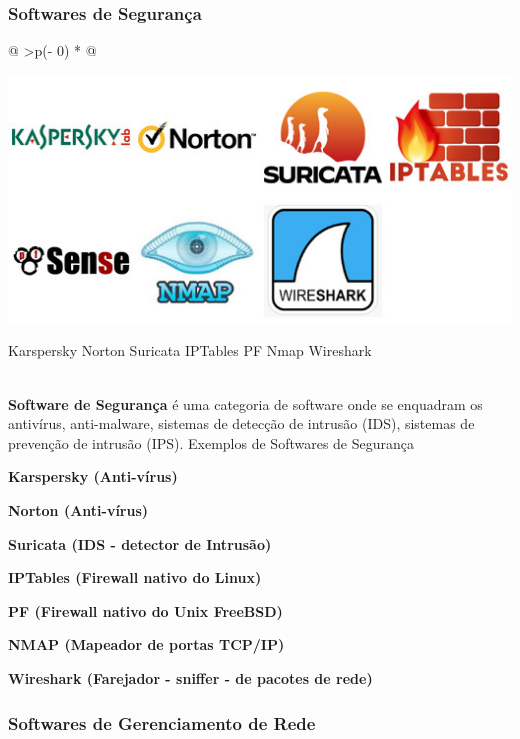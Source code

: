 \documentclass[
]{book}
\begin{document}
\subsubsection{Softwares de Segurança}\label{softwares-de-seguranuxe7a}

\begin{longtable}[]{@{}
  >{\centering\arraybackslash}p{(\columnwidth - 0\tabcolsep) * }@{}}
\toprule\noalign{}
\endhead
\bottomrule\noalign{}
\endlastfoot
\begin{minipage}[t]{\linewidth}\centering
\begin{center}
\includegraphics{images/InfraEstrutura/software/seguranca.jpg}

Karspersky Norton Suricata IPTables PF Nmap Wireshark
\end{center}
\end{minipage} \\
\textbf{Software de Segurança} é uma categoria de software onde se enquadram os antivírus, anti-malware, sistemas de detecção de intrusão (IDS), sistemas de prevenção de intrusão (IPS). Exemplos de Softwares de Segurança

\textbf{Karspersky (Anti-vírus)}

\textbf{Norton (Anti-vírus)}

\textbf{Suricata (IDS - detector de Intrusão)}

\textbf{IPTables (Firewall nativo do Linux)}

\textbf{PF (Firewall nativo do Unix FreeBSD)}

\textbf{NMAP (Mapeador de portas TCP/IP)}

\textbf{Wireshark (Farejador - sniffer - de pacotes de rede)} \\
\end{longtable}

\subsubsection{Softwares de Gerenciamento de Rede}\label{softwares-de-gerenciamento-de-rede}
\end{document}
